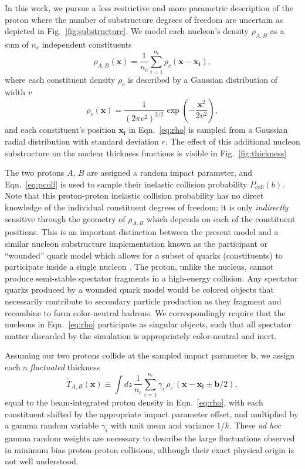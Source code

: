 \documentclass[aps,prc,reprint,amsmath,nofootinbib]{revtex4-1}
\newcommand{\T}{\tilde{T}}
\newcommand{\x}{\mathbf x}
\begin{document}
In this work, we pursue a less restrictive and more parametric description of the proton where the number of substructure degrees of freedom are uncertain as depicted in Fig.~\ref{fig:substructure}.
We model each nucleon's density $\rho_{A,B}$ as a sum of $n_c$ independent constituents
\begin{equation}
  \label{eq:rho}
  \rho_{A, B}(\x) = \frac{1}{n_c} \sum\limits_{i=1}^{n_c} \rho_c(\mathbf{x} - \mathbf{x_i}),
\end{equation}
where each constituent density $\rho_c$ is described by a Gaussian distribution of width $v$
\begin{equation}
  \label{eq:constituent_density}
  \rho_c(\mathbf{x}) = \frac{1}{(2\pi v^2)^{3/2}} \exp\left(-\frac{\x^2}{2 v^2}\right),
\end{equation}
and each constituent's position $\mathbf{x_i}$ in Eqn.~\eqref{eq:rho} is sampled from a Gaussian radial distribution with standard deviation $r$.
The effect of this additional nucleon substructure on the nuclear thickness functions is visible in Fig.~\ref{fig:thickness}

The two protons $A$, $B$ are assigned a random impact parameter, and Eqn.~\eqref{eq:pcoll} is used to sample their inelastic collision probability $P_\mathrm{coll}(b)$.
Note that this proton-proton inelastic collision probability has no direct knowledge of the individual constituent degrees of freedom; it is only \emph{indirectly} sensitive through the geometry of $\rho_{A, B}$ which depends on each of the constituent positions.
This is an important distinction between the present model and a similar nucleon substructure implementation known as the participant or ``wounded'' quark model which allows for a subset of quarks (constituents) to participate inside a single nucleon \cite{ANISOVICH1978477, Broniowski:2016pvx}.
The proton, unlike the nucleus, cannot produce semi-stable spectator fragments in a high-energy collision.
Any spectator quarks produced by a wounded quark model would be colored objects that necessarily contribute to secondary particle production as they fragment and recombine to form color-neutral hadrons.
We correspondingly require that the nucleons in Eqn.~\eqref{eq:rho} participate as singular objects, such that all spectator matter discarded by the simulation is appropriately color-neutral and inert.

Assuming our two protons collide at the sampled impact parameter $\mathbf{b}$, we assign each a \emph{fluctuated} thickness
\begin{equation}
  \label{eq:fluctuated_thick}
  \T_{A, B}(\x) \equiv \int dz\, \frac{1}{n_c} \sum\limits_{i=1}^{n_c} \gamma_i\, \rho_c \,(\mathbf{x} - \mathbf{x_i} \pm \mathbf{b}/2),
\end{equation}
equal to the beam-integrated proton density in Eqn.~\eqref{eq:rho}, with each constituent shifted by the appropriate impact parameter offset, and multiplied by a gamma random variable $\gamma_i$ with unit mean and variance $1/k$.
These \emph{ad hoc} gamma random weights are necessary to describe the large fluctuations observed in minimum bias proton-proton collisions, although their exact physical origin is not well understood.
\end{document}
